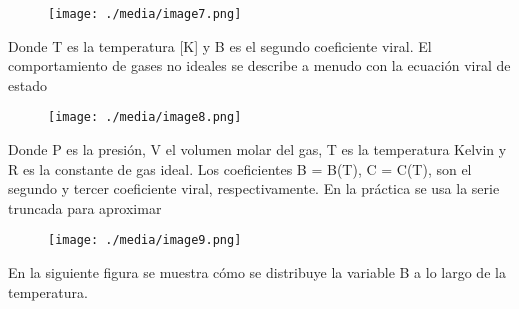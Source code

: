 \documentclass[12pt]{article}
\renewcommand{\_}{\kern-1.5pt\textunderscore\kern-1.5pt}
\begin{document}
\begin{figure}[H]
	\begin{Center}
		\texttt{[image: ./media/image7.png]}
	\end{Center}
\end{figure}



\par

Donde T es la temperatura [K] y B es el segundo coeficiente viral. El comportamiento de gases no ideales se describe a menudo con la ecuación viral de estado\par




\begin{figure}[H]
	\begin{Center}
		\texttt{[image: ./media/image8.png]}
	\end{Center}
\end{figure}



\par

Donde P es la presión, V el volumen molar del gas, T es la temperatura Kelvin y R es la constante de gas ideal. Los coeficientes B = B(T), C = C(T), son el segundo y tercer coeficiente viral, respectivamente. En la práctica se usa la serie truncada para aproximar\par




\begin{figure}[H]
	\begin{Center}
		\texttt{[image: ./media/image9.png]}
	\end{Center}
\end{figure}



\par

En la siguiente ﬁgura se muestra cómo se distribuye la variable B a lo largo de la temperatura.\par
\end{document}
